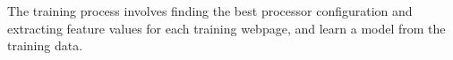 
The training process involves finding the best processor configuration and extracting feature values for each training webpage,
and learn a model from the training data.


